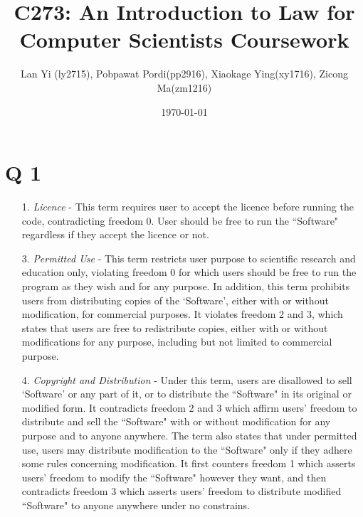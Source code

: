 \documentclass[a4wide, 10pt]{article}
\title{\vspace{-8ex}C273: An Introduction to Law for Computer Scientists Coursework\vspace{-2ex}}
\author{Lan Yi (ly2715), Pobpawat Pordi(pp2916), Xiaokage Ying(xy1716), Zicong Ma(zm1216)}
\date{\vspace{-2ex}\today\vspace{-5ex}}
\begin{document}
\maketitle
\section*{Q 1}
\begin{enumerate}
\item[1.] \emph{Licence}
 - This term requires user to accept the licence before running the code, contradicting freedom 0. User should be free to run the ``Software" regardless if they accept the licence or not. 
\item[3.] \emph{Permitted Use}
- This term restricts user purpose to scientific research and education only, violating freedom 0 for which users should be free to run the program as they wish and for any purpose. In addition, this term prohibits users from distributing copies of the `Software', either with or without modification, for commercial purposes. It violates freedom 2 and 3, which states that users are free to redistribute copies, either with or without modifications for any purpose, including but not limited to commercial purpose. 
\item[4.] \emph{Copyright and Distribution}
- Under this term, users are disallowed to sell `Software' or any part of it, or to distribute the ``Software" in its original or modified form. It contradicts freedom 2 and 3 which affirm users' freedom to distribute and sell the ``Software" with or without modification for any purpose and to anyone anywhere. The term also states that under permitted use, users may distribute modification to the ``Software" only if they adhere some rules concerning modification. It first counters freedom 1 which asserts users' freedom to modify the ``Software" however they want, and then contradicts freedom 3 which asserts users' freedom to distribute modified ``Software" to anyone anywhere under no constrains. 


\end{enumerate}
\end{document}
